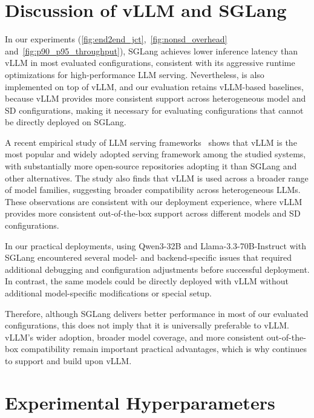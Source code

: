 \clearpage

\section{Discussion of vLLM and SGLang}
\label{appendix:vllm-sglang}

In our experiments (\autoref{fig:end2end_jct},~\autoref{fig:nonsd_overhead} and~\autoref{fig:p90_p95_throughput}), SGLang achieves lower inference latency than vLLM in most evaluated configurations, consistent with its aggressive runtime optimizations for high-performance LLM serving. Nevertheless, \sysname is also implemented on top of vLLM, and our evaluation retains vLLM-based baselines, because vLLM provides more consistent support across heterogeneous model and SD configurations, making it necessary for evaluating configurations that cannot be directly deployed on SGLang.

A recent empirical study of LLM serving frameworks~\citep{LLM_Serving_in_the_Wild} shows that vLLM is the most popular and widely adopted serving framework among the studied systems, with substantially more open-source repositories adopting it than SGLang and other alternatives. The study also finds that vLLM is used across a broader range of model families, suggesting broader compatibility across heterogeneous LLMs. These observations are consistent with our deployment experience, where vLLM provides more consistent out-of-the-box support across different models and SD configurations.

In our practical deployments, using Qwen3-32B and Llama-3.3-70B-Instruct with SGLang encountered several model- and backend-specific issues that required additional debugging and configuration adjustments before successful deployment. 
In contrast, the same models could be directly deployed with vLLM without additional model-specific modifications or special setup.

Therefore, although SGLang delivers better performance in most of our evaluated configurations, this does not imply that it is universally preferable to vLLM. vLLM's wider adoption, broader model coverage, and more consistent out-of-the-box compatibility remain important practical advantages, which is why \sysname continues to support and build upon vLLM.

\clearpage

\section{Experimental Hyperparameters}
\label{app:hyperparameters}

